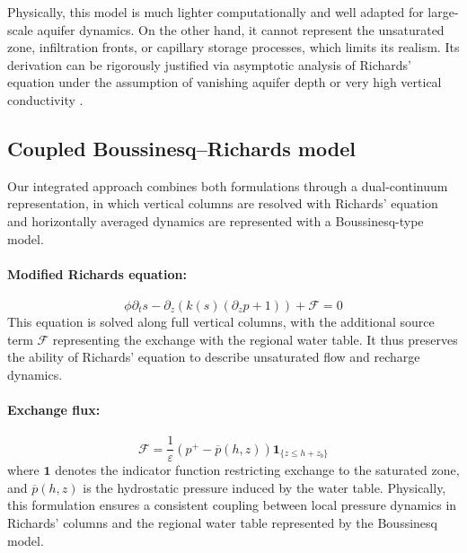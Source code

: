 \documentclass[12pt,a4paper]{article}
\begin{document}
Physically, this model is much lighter computationally and well adapted for large-scale aquifer dynamics. On the other hand, it cannot represent the unsaturated zone, infiltration fronts, or capillary storage processes, which limits its realism.  
Its derivation can be rigorously justified via asymptotic analysis of Richards’ equation under the assumption of vanishing aquifer depth or very high vertical conductivity \cite{Blendinger}.



\subsection{Coupled Boussinesq–Richards model}  
Our integrated approach combines both formulations through a dual-continuum representation, in which vertical columns are resolved with Richards’ equation and horizontally averaged dynamics are represented with a Boussinesq-type model.

\paragraph{Modified Richards equation:}  
\begin{equation}\label{mod_richards}
\phi \partial_t s - \partial_z \left( k(s) (\partial_z p + 1) \right) + \mathcal{F} = 0
\end{equation}
This equation is solved along full vertical columns, with the additional source term $\mathcal{F}$ representing the exchange with the regional water table.  
It thus preserves the ability of Richards’ equation to describe unsaturated flow and recharge dynamics.

\paragraph{Exchange flux:}  
\begin{equation}\label{exchange_flux}
\mathcal{F} = \frac{1}{\varepsilon} \left( p^+ - \overline{p}(h,z) \right) \mathbf{1}_{\{z \leq h + z_b\}}
\end{equation}
where $\mathbf{1}$ denotes the indicator function restricting exchange to the saturated zone, and $\overline{p}(h,z)$ is the hydrostatic pressure induced by the water table.  
Physically, this formulation ensures a consistent coupling between local pressure dynamics in Richards’ columns and the regional water table represented by the Boussinesq model.
\end{document}
